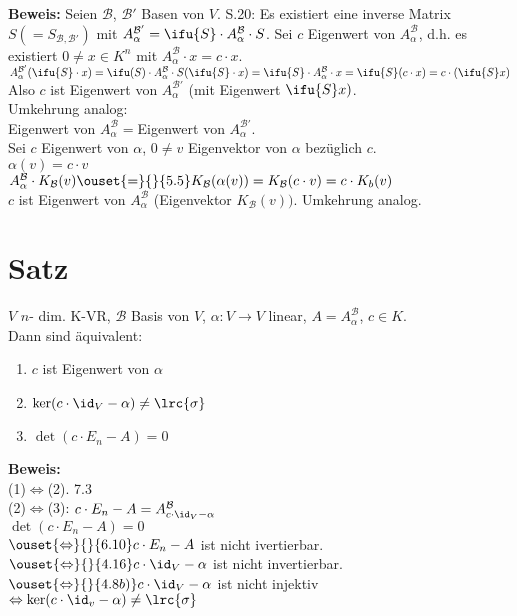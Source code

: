   \textbf{Beweis:} Seien ${\mathcal{B}}$, $\mathcal{B}'$ Basen von $V$. S.20:
  Es existiert eine inverse Matrix $S(=S_{\mathcal{B},\mathcal{B}'})$ mit
  $A_\alpha^{\mathcal{B}'}=\ifu{S}\cdot A_\alpha^{\mathcal{B}}\cdot S$. Sei $c$
  Eigenwert von $A_\alpha^{\mathcal{B}}$, d.h. es existiert $0\neq x\in K^n$ mit
  $A_\alpha^{\mathcal{B}}\cdot x=c\cdot x$.\\
  $A_\alpha^{\mathcal{B}'}(\ifu{S}\cdot x)=\ifu(S)\cdot
  A_\alpha^{\mathcal{B}}\cdot S(\ifu{S}\cdot x)=\ifu{S}\cdot
  A_\alpha^{\mathcal{B}}\cdot x=\ifu{S}(c\cdot x)=c\cdot(\ifu{S}x)$\\
  Also $c$ ist Eigenwert von $A_\alpha^{\mathcal{B}'}$ (mit Eigenwert
  $\ifu{S}x)$.\\
  Umkehrung analog:\\
  Eigenwert von $A_\alpha^{\mathcal{B}}=$Eigenwert von $A_\alpha^{\mathcal{B}'}$.\\
  Sei $c$ Eigenwert von $\alpha$, $0\neq v$ Eigenvektor von $\alpha$ bezüglich
  $c$.\\
  $\alpha(v)=c\cdot v$\\
  $A_\alpha^{\mathcal{B}}\cdot
  K_{\mathcal{B}}(v)\ouset{=}{}{5.5}K_{\mathcal{B}}(\alpha(v))=K_{\mathcal{B}}(c\cdot
  v)=c\cdot K_b(v)$\\
  $c$ ist Eigenwert von $A_\alpha^{\mathcal{B}}$ (Eigenvektor
  $K_{\mathcal{B}}(v))$. Umkehrung analog.

\section{Satz}
  $V$ $n$- dim. K-VR, $\mathcal{B}$ Basis von $V$, $\alpha:V\rightarrow V$ linear,
  $A=A_\alpha^{\mathcal{B}}$, $c\in K.$\\
  Dann sind äquivalent:
  \begin{enumerate}[(1)]
    \item $c$ ist Eigenwert von $\alpha$
    \item $\mbox{ker}(c\cdot\id_V-\alpha)\neq\lrc{\sigma}$
    \item $\det(c\cdot E_n-A)=0$
  \end{enumerate}

  \textbf{Beweis:}\\
  (1)$\Leftrightarrow$(2). 7.3\\
  (2)$\Leftrightarrow$(3): $c\cdot E_n-A=A_{c\cdot\id_V-\alpha}^{\mathcal{B}}$\\
  $\det(c\cdot E_n-A)=0$\\
  $\ouset{\Leftrightarrow}{}{6.10} c\cdot E_n-A$ ist nicht ivertierbar.\\
  $\ouset{\Leftrightarrow}{}{4.16} c\cdot\id_V-\alpha$ ist nicht invertierbar.\\
  $\ouset{\Leftrightarrow}{}{4.8b)} c\cdot\id_V-\alpha$ ist nicht injektiv\\
  $\Leftrightarrow \mbox{ker}(c\cdot\id_v-\alpha)\neq\lrc{\sigma}$

